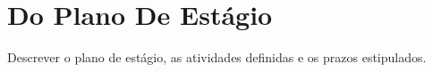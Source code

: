\chapter{Do Plano De Estágio}
\label{cap:plano}

Descrever o plano de estágio, as atividades definidas e os prazos estipulados.